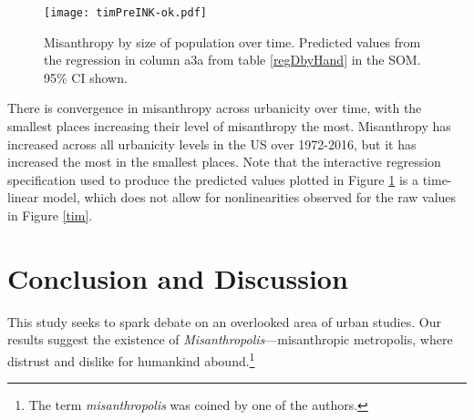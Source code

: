 \documentclass[11pt, letterpaper]{article}
\begin{document}
\begin{spacing}{1.4}
\begin{figure}[H]
  \texttt{[image: timPreINK-ok.pdf]}\centering
\caption{Misanthropy by size of population over time. Predicted values from the regression in column a3a from table \ref{regDbyHand} in the SOM. 95\% CI shown.}\label{timPre}%
\end{figure}

There is convergence in misanthropy across urbanicity over time, with the
smallest places increasing their level of misanthropy the most. Misanthropy has
increased across all urbanicity levels in the US over 1972-2016, but it has
increased the most in the smallest places. %
 Note that the interactive regression
specification used to produce the predicted values plotted in Figure
\ref{timPre} is a time-linear model, which does not allow for nonlinearities observed for the raw values in Figure \ref{tim}.

%


\section*{Conclusion and Discussion}

This study seeks to spark debate on an overlooked area of urban studies. 
 Our results suggest the existence of
\emph{Misanthropolis}---misanthropic metropolis,  where distrust and dislike for humankind
abound.\footnote{The term \emph{misanthropolis} was coined by one of the authors.}



\end{spacing}
\end{document}
